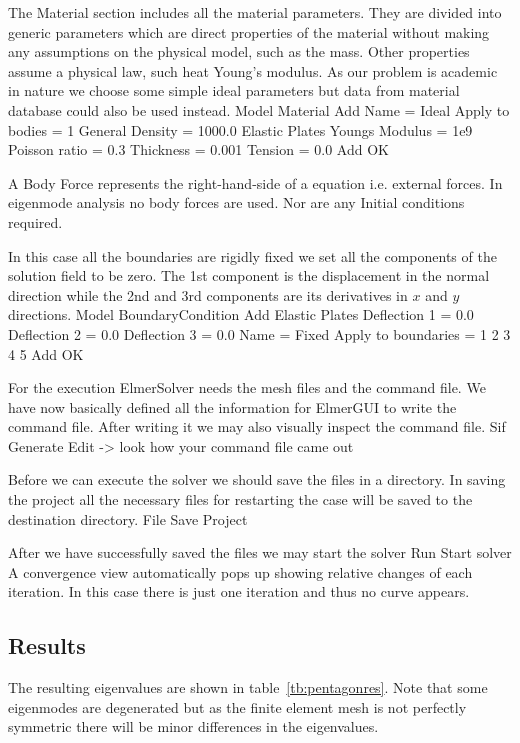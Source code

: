 The Material section includes all the material parameters.
They are divided into generic parameters which are direct properties of the material
without making any assumptions on the physical model, such as the mass. Other properties assume
a physical law, such heat Young's modulus. As our problem is academic in nature we choose some 
simple ideal parameters but data from material database could also be used instead.
\ttbegin
Model
  Material
    Add 
      Name = Ideal
      Apply to bodies = 1 
      General    
        Density = 1000.0
      Elastic Plates
        Youngs Modulus = 1e9
        Poisson ratio = 0.3
        Thickness = 0.001
        Tension = 0.0	
      Add
      OK
\ttend

A Body Force represents the right-hand-side of a equation i.e. external forces. In eigenmode analysis
no body forces are used. Nor are any Initial conditions required.

In this case all the boundaries are rigidly fixed we set all the components of the 
solution field to be zero. The 1st component is the displacement in the normal direction
while the 2nd and 3rd components are its derivatives in $x$ and $y$ directions.
\ttbegin
Model
  BoundaryCondition
    Add 
      Elastic Plates
        Deflection 1 = 0.0
        Deflection 2 = 0.0
        Deflection 3 = 0.0
      Name = Fixed
      Apply to boundaries = 1 2 3 4 5
      Add
      OK
\ttend   

For the execution 
ElmerSolver needs the mesh files and the command file. We have now basically defined
all the information for ElmerGUI to write the command file. After writing it we may also visually 
inspect the command file.
\ttbegin
Sif 
  Generate
  Edit -> look how your command file came out  
\ttend

Before we can execute the solver we should save the files in a directory. In saving the project all the
necessary files for restarting the case will be saved to the 
destination directory.
\ttbegin
File 
  Save Project
\ttend

After we have successfully saved the files we may start the solver
\ttbegin
Run
  Start solver
\ttend
A convergence view automatically pops up showing relative changes of each iteration.
In this case there is just one iteration and thus no curve appears.

\subsection*{Results}
The resulting eigenvalues are shown in table~\ref{tb:pentagonres}.
Note that some eigenmodes are degenerated but as the finite element mesh is not
perfectly symmetric there will be minor differences in the eigenvalues.


